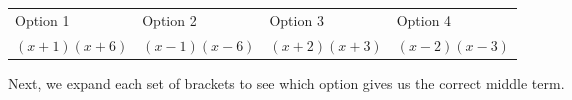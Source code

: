 \begin{table}[H]
\begin{center}
\label{m39394*id276099}
\noindent
\tabletail{%
}
\tablelasttail{}
\begin{xtabular}[t]{|l|l|l|l|}\hline
Option 1 &
Option 2 &
Option 3 &
Option 4%
\tabularnewline{}
  $\left(x+1\right)\left(x+6\right)$
  &
  $\left(x-1\right)\left(x-6\right)$
  &
  $\left(x+2\right)\left(x+3\right)$
  &
  $\left(x-2\right)\left(x-3\right)$
\tabularnewline{}
\end{xtabular}
\end{center}
\end{table}
\par
\label{m39394*id276261}Next, we expand each set of brackets to see which option gives us the correct middle term.\par 
